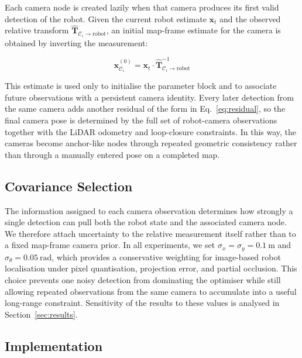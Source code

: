 Each camera node is created lazily when that camera produces its first valid
detection of the robot.
Given the current robot estimate $\mathbf{x}_t$ and the observed relative
transform $\hat{\mathbf{T}}_{\mathcal{C}_i \to \text{robot}}$, an initial
map-frame estimate for the camera is obtained by inverting the measurement:

\begin{equation}
    \mathbf{x}^{(0)}_{\mathcal{C}_i} =
    \mathbf{x}_t \cdot
    \hat{\mathbf{T}}_{\mathcal{C}_i \to \text{robot}}^{-1}
    \label{eq:camera_init}
\end{equation}

This estimate is used only to initialise the parameter block and to associate
future observations with a persistent camera identity.
Every later detection from the same camera adds another residual of the form
in Eq.~\ref{eq:residual}, so the final camera pose is determined by the full
set of robot-camera observations together with the LiDAR odometry and
loop-closure constraints.
In this way, the cameras become anchor-like nodes through repeated geometric
consistency rather than through a manually entered pose on a completed map.

\subsection{Covariance Selection}
\label{sec:covariance}

The information assigned to each camera observation determines how strongly a
single detection can pull both the robot state and the associated camera node.
We therefore attach uncertainty to the relative measurement itself rather than
to a fixed map-frame camera prior.
In all experiments, we set $\sigma_x = \sigma_y = \SI{0.1}{\metre}$ and
$\sigma_\theta = \SI{0.05}{\radian}$, which provides a conservative weighting
for image-based robot localisation under pixel quantisation, projection error,
and partial occlusion.
This choice prevents one noisy detection from dominating the optimiser while
still allowing repeated observations from the same camera to accumulate into a
useful long-range constraint.
Sensitivity of the results to these values is analysed in
Section~\ref{sec:results}.

\subsection{Implementation}
\label{sec:implementation}

